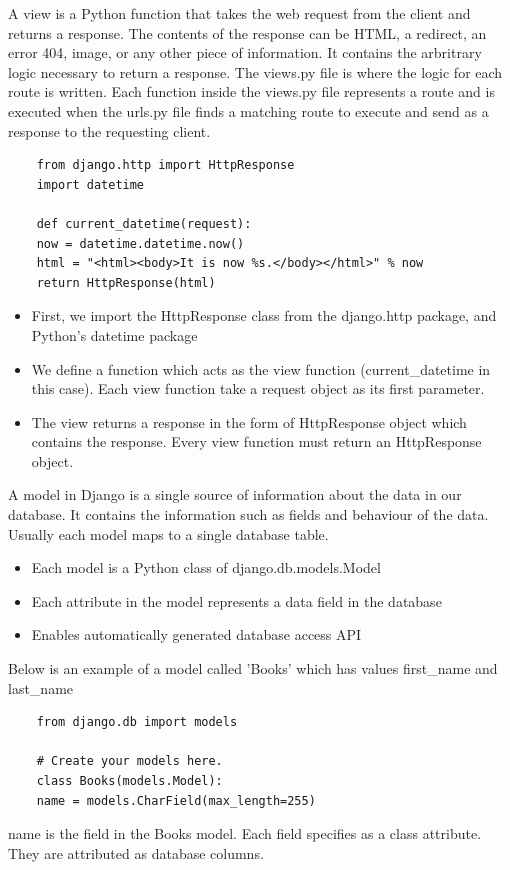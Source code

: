 \documentclass[../thesis.tex]{subfiles}
\begin{document}
	A view is a Python function that takes the web request from the client and returns a response. The contents of the response can be HTML, a redirect, an error 404, image, or any other piece of information. It contains the arbritrary logic necessary to return a response. The views.py file is where the logic for each route is written. Each function inside the views.py file represents a route and is executed when the urls.py file finds a matching route to execute and send as a response to the requesting client. 
	\begin{verbatim}
	from django.http import HttpResponse
	import datetime
	
	def current_datetime(request):
	now = datetime.datetime.now()
	html = "<html><body>It is now %s.</body></html>" % now
	return HttpResponse(html)
	\end{verbatim}
	\begin{itemize}
		\item First, we import the HttpResponse class from the django.http package, and Python's datetime package
		\smallskip
		\item We define a function which acts as the view function (current\_datetime in this case). Each view function take a request object as its first parameter.
		\smallskip
		\item The view returns a response in the form of HttpResponse object which contains the response. Every view function must return an HttpResponse object.
	\end{itemize}
	A model in Django is a single source of information about the data in our database. It contains the information such as fields and behaviour of the data. Usually each model maps to a single database table.
	\begin{itemize}
		\item Each model is a Python class of django.db.models.Model
		\smallskip
		\item Each attribute in the model represents a data field in the database
		\smallskip
		\item Enables automatically generated database access API
	\end{itemize}
	Below is an example of a model called 'Books' which has values first\_name and last\_name
	\begin{verbatim}
	from django.db import models
	
	# Create your models here.
	class Books(models.Model):
	name = models.CharField(max_length=255)
	\end{verbatim}
	name is the field in the Books model. Each field specifies as a class attribute. They are attributed as database columns.
	\newline
\end{document}
